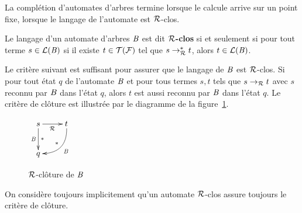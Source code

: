 




La complétion d'automates d'arbres termine lorsque le calcule arrive sur un point fixe,
lorsque le langage de l'automate est $\mathcal R$-clos.


\begin{definition}
  Le langage d'un automate d'arbres $\mathit B$ est dit \textbf{$\mathcal R$-clos} si et seulement si 
  pour tout terme $s \in \mathcal{L}(\mathit B)$ si il existe $t \in \mathcal{T(F)}$ tel que $s \rightarrow_\mathcal R^* t$, 
  alors $t \in \mathcal{L}(\mathit B)$. 

  Le critère suivant est suffisant pour assurer que le langage de $\mathit B$ est $\mathcal R$-clos.
  Si pour tout état $q$ de l'automate $\mathit B$ et pour tous termes $s,t$ tels que 
  $s \rightarrow_\mathcal R t$ avec $s$ reconnu par $\mathit B$ dans l'état $q$, alors $t$ est aussi reconnu par $\mathit B$ dans l'état $q$.
  Le critère de clôture est illustrée par le diagramme de la figure~\ref{fig:R-cloture}.
  \begin{figure}[ht!]
    \centering
    $
    \xymatrix{
      s \ar[r]_{\R}\ar[d]^{*}_{\B} & t \ar@/^1.2pc/[ld]_{*}^{\B}\\
      q & %
    }
    $
    \caption{\footnotesize $\mathcal R$-clôture de $\mathit B$}
    \label{fig:R-cloture}
  \end{figure}
  On considère toujours implicitement qu'un automate $\mathcal R$-clos
  assure toujours le critère de clôture.
\end{definition}

